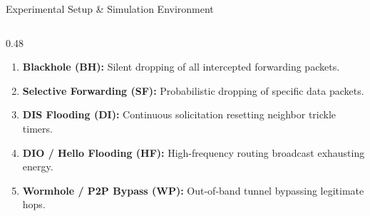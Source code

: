 \documentclass[aspectratio=169, 10pt]{beamer}
\begin{document}
\begin{frame}{Experimental Setup \& Simulation Environment}
\begin{columns}[T]
\begin{column}{0.48\textwidth}
\begin{enumerate}
        \item \textbf{Blackhole (BH):} Silent dropping of all intercepted forwarding packets.
        \item \textbf{Selective Forwarding (SF):} Probabilistic dropping of specific data packets.
        \item \textbf{DIS Flooding (DI):} Continuous solicitation resetting neighbor trickle timers.
        \item \textbf{DIO / Hello Flooding (HF):} High-frequency routing broadcast exhausting energy.
        \item \textbf{Wormhole / P2P Bypass (WP):} Out-of-band tunnel bypassing legitimate hops.
      \end{enumerate}
    \end{column}
  \end{columns}
\end{frame}

\end{document}
